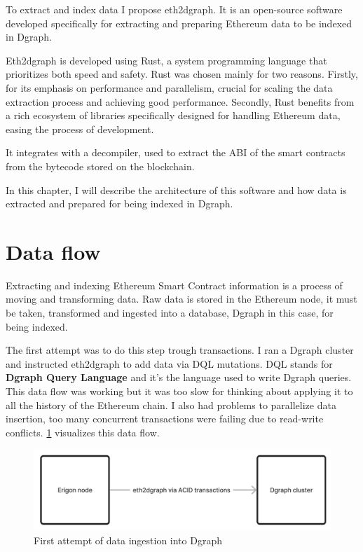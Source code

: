 
\noindent To extract and index data I propose eth2dgraph. It is an open-source software developed specifically for extracting and preparing Ethereum data to be indexed in Dgraph. 

Eth2dgraph is developed using Rust, a system programming language that prioritizes both speed and safety. Rust was chosen mainly for two reasons. Firstly, for its emphasis on performance and parallelism, crucial for scaling the data extraction process and achieving good performance. Secondly, Rust benefits from a rich ecosystem of libraries specifically designed for handling Ethereum data, easing the process of development.

It integrates with a decompiler, used to extract the ABI of the smart contracts from the bytecode stored on the blockchain.

In this chapter, I will describe the architecture of this software and how data is extracted and prepared for being indexed in Dgraph.

\section{Data flow}

Extracting and indexing Ethereum Smart Contract information is a process of moving and transforming data. Raw data is stored in the Ethereum node, it must be taken, transformed and ingested into a database, Dgraph in this case, for being indexed. 

The first attempt was to do this step trough transactions. I ran a Dgraph cluster and instructed eth2dgraph to add data via DQL mutations. DQL stands for \textbf{Dgraph Query Language} and it's the language used to write Dgraph queries. This data flow was working but it was too slow for thinking about applying it to all the history of the Ethereum chain. I also had problems to parallelize data insertion, too many concurrent transactions were failing due to read-write conflicts. \cref{fig:data-flow-1} visualizes this data flow.

\begin{figure}[H]
  \centering
  \includegraphics[width=1\textwidth]{Figures/methods/data-flow-1.jpg}
  \caption[First attempt of data ingestion into Dgraph]{First attempt of data ingestion into Dgraph}
  \label{fig:data-flow-1}
\end{figure}

